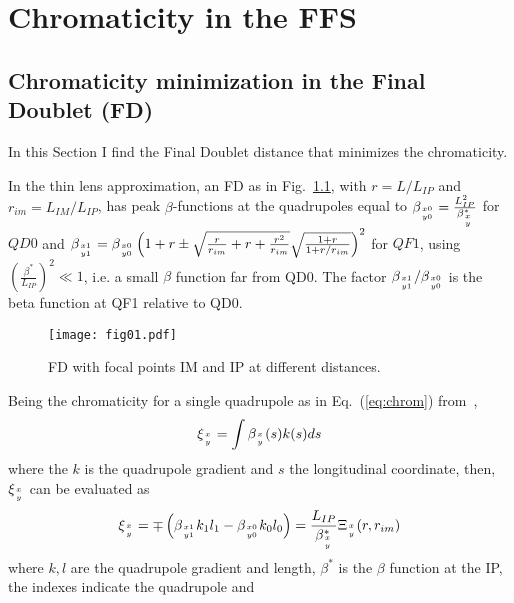 \chapter{Chromaticity in the FFS}\label{s:FFS}
\section{Chromaticity minimization in the Final Doublet (FD)}\label{s:chromFD}
In this Section I find the Final Doublet distance that minimizes the chromaticity.\par 
In the thin lens approximation, an FD as in Fig.~\ref{f:FDchrom}, with $r=L/L_{IP}$ and $r_{im}=L_{IM}/L_{IP}$, has peak $\beta$-functions at the quadrupoles equal to $\beta_{x0\atop y0}=\frac{L^2_{IP}}{\beta^*_{x\atop y}}$  for $QD0$ and $
\beta_{x1\atop y1}=\beta_{x0\atop y0}\left(1+r\pm\sqrt{\frac{r}{r_{im}}+r+\frac{r^2}{r_{im}}}\sqrt{\frac{1+r}{1+r/r_{im}}}\right)^2
$ for $QF1$, using $\left(\frac{\beta^*}{L_{IP}}\right)^2\ll1$, i.e. a small $\beta$ function far from QD0. The factor $\beta_{x1\atop y1}/\beta_{x0\atop y0}$ is the beta function at QF1 relative to QD0.\par
\begin{figure}[!htb]
 \centering
 \texttt{[image: fig01.pdf]}\caption{FD with focal points IM and IP at different distances.}\label{f:FDchrom}
 \end{figure}
Being the chromaticity for a single quadrupole as in Eq.~(\ref{eq:chrom}) from~\cite{GarciaMorales:1982827}, 
\begin{equation}
\xi_{x\atop y}=\int\beta_{x\atop y}(s)k(s)ds\label{eq:chrom}
\end{equation}
where the $k$ is the quadrupole gradient and $s$ the longitudinal coordinate, then, $\xi_{x\atop y}$ can be evaluated as
\begin{equation}
 \xi_{x\atop y}=\mp\left(\beta_{x1\atop y1}k_1l_1-\beta_{x0\atop y0}k_0l_0\right)=\frac{L_{IP}}{\beta^*_{x\atop y}}\Xi_{x\atop y}(r,r_{im})
\end{equation}
where $k,l$ are the quadrupole gradient and length, $\beta^*$ is the $\beta$ function at the IP, the indexes indicate the quadrupole and 
